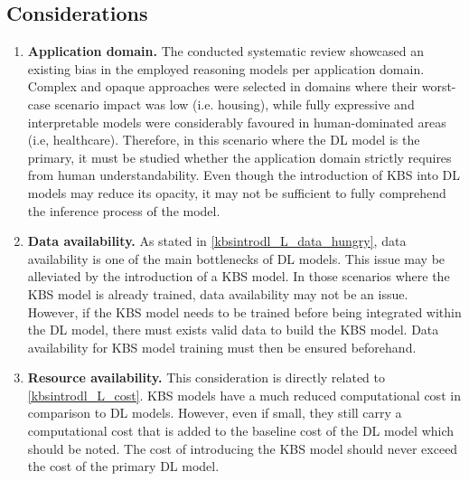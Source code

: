 \subsection{Considerations}
\begin{enumerate} [start=1,label={\bfseries C\arabic*.}]
    \item \label{kbsintrodl_C_domain} \textbf{Application domain.} The conducted systematic review \citep{amador_systematic_review_2019} showcased an existing bias in the employed reasoning models per application domain. Complex and opaque approaches were selected in domains where their worst-case scenario impact was low (i.e. housing), while fully expressive and interpretable models were considerably favoured in human-dominated areas (i.e, healthcare). Therefore, in this scenario where the DL model is the primary, it must be studied whether the application domain strictly requires from human understandability. Even though the introduction of KBS into DL models may reduce its opacity, it may not be sufficient to fully comprehend the inference process of the model. 
    
    \item  \label{kbsintrodl_C_data} \textbf{Data availability.} As stated in \ref{kbsintrodl_L_data_hungry}, data availability is one of the main bottlenecks of DL models. This issue may be alleviated by the introduction of a KBS model. In those scenarios where the KBS model is already trained, data availability may not be an issue. However, if the KBS model needs to be trained before being integrated within the DL model, there must exists valid data to build the KBS model. Data availability for KBS model training must then be ensured beforehand.
    
    \item  \label{kbsintrodl_C_resource} \textbf{Resource availability.} This consideration is directly related to \ref{kbsintrodl_L_cost}. KBS models have a much reduced computational cost in comparison to DL models. However, even if small, they still carry a computational cost that is added to the baseline cost of the DL model which should be noted. The cost of introducing the KBS model should never exceed the cost of the primary DL model.
    
\end{enumerate}
